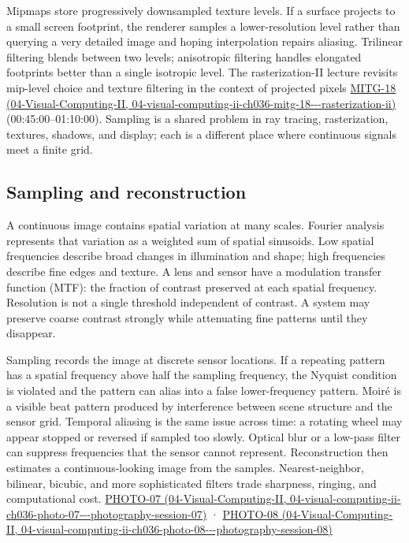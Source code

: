 Mipmaps store progressively downsampled texture levels. If a surface projects to a small screen footprint, the renderer samples a lower-resolution level rather than querying a very detailed image and hoping interpolation repairs aliasing. Trilinear filtering blends between two levels; anisotropic filtering handles elongated footprints better than a single isotropic level. The rasterization-II lecture revisits mip-level choice and texture filtering in the context of projected pixels \href{../04-Visual-Computing-II/main.pdf\#nameddest=04-visual-computing-ii-ch036-mitg-18---rasterization-ii}{MITG-18 (04-Visual-Computing-II, 04-visual-computing-ii-ch036-mitg-18-\/-\/-rasterization-ii)} (00:45:00--01:10:00). Sampling is a shared problem in ray tracing, rasterization, textures, shadows, and display; each is a different place where continuous signals meet a finite grid.

\subsection{Sampling and reconstruction}\label{03-visual-computing-i-ch003-sampling-and-reconstruction}

A continuous image contains spatial variation at many scales. Fourier analysis represents that variation as a weighted sum of spatial sinusoids. Low spatial frequencies describe broad changes in illumination and shape; high frequencies describe fine edges and texture. A lens and sensor have a modulation transfer function (MTF): the fraction of contrast preserved at each spatial frequency. Resolution is not a single threshold independent of contrast. A system may preserve coarse contrast strongly while attenuating fine patterns until they disappear.

Sampling records the image at discrete sensor locations. If a repeating pattern has a spatial frequency above half the sampling frequency, the Nyquist condition is violated and the pattern can alias into a false lower-frequency pattern. Moiré is a visible beat pattern produced by interference between scene structure and the sensor grid. Temporal aliasing is the same issue across time: a rotating wheel may appear stopped or reversed if sampled too slowly. Optical blur or a low-pass filter can suppress frequencies that the sensor cannot represent. Reconstruction then estimates a continuous-looking image from the samples. Nearest-neighbor, bilinear, bicubic, and more sophisticated filters trade sharpness, ringing, and computational cost. \href{../04-Visual-Computing-II/main.pdf\#nameddest=04-visual-computing-ii-ch036-photo-07---photography-session-07}{PHOTO-07 (04-Visual-Computing-II, 04-visual-computing-ii-ch036-photo-07-\/-\/-photography-session-07)} · \href{../04-Visual-Computing-II/main.pdf\#nameddest=04-visual-computing-ii-ch036-photo-08---photography-session-08}{PHOTO-08 (04-Visual-Computing-II, 04-visual-computing-ii-ch036-photo-08-\/-\/-photography-session-08)}


